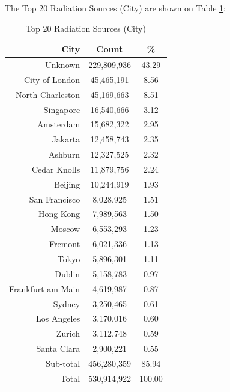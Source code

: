 \newpage
The Top 20 Radiation Sources (City) are shown on Table \ref{tab:top20radiationsources(city)}:
\begin{table}[!h]
\begin{center}
\caption{Top 20 Radiation Sources (City)}
\label{tab:top20radiationsources(city)}
\begin{tabular}{ |r|c|c| }
\hline
\centering City & Count & \%  \\
\hline
Unknown & 229,809,936 & 43.29  \\
City of London & 45,465,191 & 8.56  \\
North Charleston & 45,169,663 & 8.51  \\
Singapore & 16,540,666 & 3.12  \\
Amsterdam & 15,682,322 & 2.95  \\
Jakarta & 12,458,743 & 2.35  \\
Ashburn & 12,327,525 & 2.32  \\
Cedar Knolls & 11,879,756 & 2.24  \\
Beijing & 10,244,919 & 1.93  \\
San Francisco & 8,028,925 & 1.51  \\
Hong Kong & 7,989,563 & 1.50  \\
Moscow & 6,553,293 & 1.23  \\
Fremont & 6,021,336 & 1.13  \\
Tokyo & 5,896,301 & 1.11  \\
Dublin & 5,158,783 & 0.97  \\
Frankfurt am Main & 4,619,987 & 0.87  \\
Sydney & 3,250,465 & 0.61  \\
Los Angeles & 3,170,016 & 0.60  \\
Zurich & 3,112,748 & 0.59  \\
Santa Clara & 2,900,221 & 0.55  \\
\hline
Sub-total & 456,280,359 & 85.94  \\
\hline
Total & 530,914,922 & 100.00  \\
\hline
\end{tabular}
\end{center}
\end{table}

